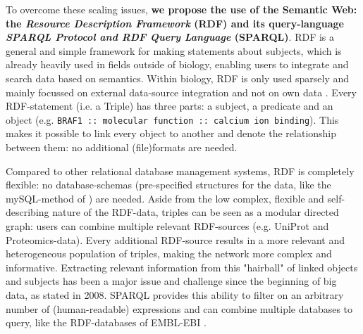 \documentclass[twoside,fontsize=10pt]{article}
\begin{document}
\noindent
To overcome these scaling issues, \textbf{we propose the use of the Semantic Web: the \textit{Resource Description Framework} (RDF) and its query-language \textit{SPARQL Protocol and RDF Query Language} (SPARQL)}. RDF is a general and simple framework for making statements about subjects, which is already heavily used in fields outside of biology, enabling users to integrate and search data based on semantics. Within biology, RDF is only used sparsely and mainly focussed on external data-source integration and not on own data \cite{Belleau2008,Neumann2006,Sahoo2008}. Every RDF-statement (i.e. a Triple) has three parts: a subject, a predicate and an object (e.g. \lstinline|BRAF1 :: molecular function :: calcium ion binding|). This makes it possible to link every object to another and denote the relationship between them: no additional (file)formats are needed. 

Compared to other relational database management systems, RDF is completely flexible: no database-schemas (pre-specified structures for the data, like the mySQL-method of \citet{Low2013}) are needed. Aside from the low complex, flexible and self-describing nature of the RDF-data, triples can be seen as a modular directed graph: users can combine multiple relevant RDF-sources (e.g. UniProt and Proteomics-data). Every additional RDF-source results in a more relevant and heterogeneous population of triples, making the network more complex and informative. Extracting relevant information from this "hairball" of linked objects and subjects has been a major issue and challenge since the beginning of big data, as \citet{Pavlopoulos2008} stated in 2008. SPARQL provides this ability to filter on an arbitrary number of (human-readable) expressions and can combine multiple databases to query, like the RDF-databases of EMBL-EBI \citep{Jupp2014}. 
\medskip
\end{document}
